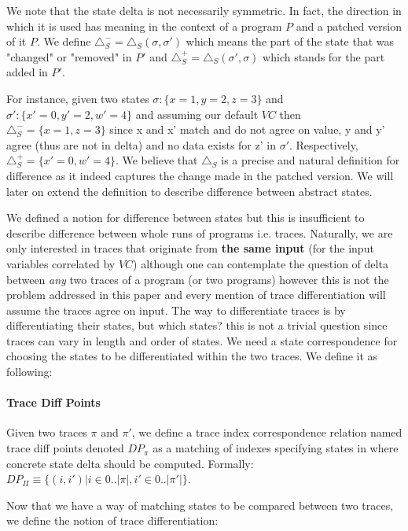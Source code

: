 We note that the state delta is not necessarily symmetric. In fact, the direction in which it is used has meaning in the context of a program $P$ and a patched version of it $P$. We define $\triangle_{S}^{-} = \triangle_{S}(\sigma,\sigma')$ which means the part of the state that was "changed" or "removed" in $P'$ and $\triangle_{S}^{+} = \triangle_{S}(\sigma',\sigma)$ which stands for the part added in $P'$.

For instance, given two states $\sigma:\{x=1,y=2,z=3\}$ and $\sigma':\{x'=0,y'=2,w'=4\}$ and assuming our default $VC$ then $\triangle_{S}^{-} = \{x=1,z=3\}$ since x and x' match and do not agree on value, y and y' agree (thus are not in delta) and no data exists for z' in $\sigma'$. Respectively, $\triangle_{S}^{+} = \{x'=0,w'=4\}$. We believe that $\triangle_{S}$ is a precise and natural definition for difference as it indeed captures the change made in the patched version. We will later on extend the definition to describe difference between abstract states.

We defined a notion for difference between states but this is insufficient to describe difference between whole runs of programs i.e. traces. Naturally, we are only interested in traces that originate from \textbf{the same input} (for the input variables correlated by $VC$) although one can contemplate the question of delta between \emph{any} two traces of a program (or two programs) however this is not the problem addressed in this paper and every mention of trace differentiation will assume the traces agree on input. The way to differentiate traces is by differentiating their states, but which states? this is not a trivial question since traces can vary in length and order of states. We need a state correspondence for choosing the states to be differentiated within the two traces. We define it as following:

\paragraph{Trace Diff Points} 
Given two traces $\pi$ and $\pi'$, we define a trace index correspondence relation named trace diff points denoted $DP_{\pi}$ as a matching of indexes specifying states in where concrete state delta should be computed. Formally: $DP_{\Pi} \equiv \{(i,i')|i \in {0..|\pi|}, i' \in {0..|\pi'|}\}$.


Now that we have a way of matching states to be compared between two traces, we define the notion of trace differentiation:

